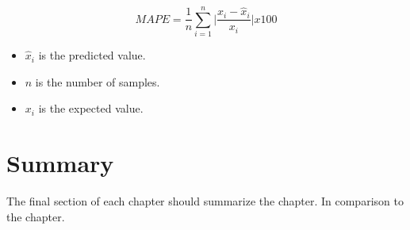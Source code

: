 \begin{equation}\label{eq:MAPE}
    MAPE = \frac{1}{n} \sum_{i=1}^{n} \bigg| \frac{x_i - \hat{x}_i}{x_i} \bigg| x 100
\end{equation}

\begin{itemize}
    \item \begin{math}\hat{x}_i\end{math} is the predicted value.
    \item \begin{math}n\end{math} is the number of samples.
    \item \begin{math}x_i\end{math} is the expected value.
\end{itemize}


\section{Summary}
\label{s:Background-Summary}

The final section of each chapter should summarize the chapter. In comparison to the chapter.

